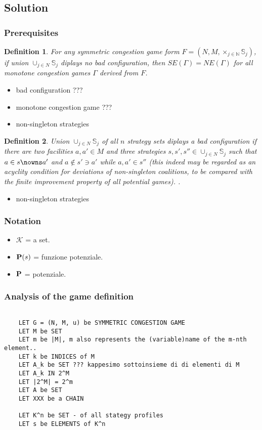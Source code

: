 \documentclass{article}
\newtheorem{defn}{Definition}
\begin{document}
\subsection{Solution}
\subsubsection{Prerequisites}

\begin{defn}
	For any \emph{symmetric congestion game form} $F = (N, M, \times_{j \in \mathbb{N}} \mathbb{S}_j )$, if union $\cup_{j \in N} \mathbb{S}_j$ diplays no bad configuration, then $SE(\Gamma) = NE(\Gamma)$ for all monotone congestion games $\Gamma$ derived from $F$.
\end{defn}
\begin{itemize}
	\item bad configuration ???
	\item monotone congestion game ???
	\item non-singleton strategies
\end{itemize}

\begin{defn}
	Union $\cup_{j \in N} \mathbb{S}_j$ of all $n$ strategy sets diplays a \emph{bad configuration} if there are two facilities $a, a' \in M$ and three strategies $s, s', s'' \in \cup_{j \in N} \mathbb{S}_j$ such that $a \in s \nowns a'$ and $a \not\in s' \owns a'$ while $a, a' \in s''$ (this indeed may be regarded as an acyclity condition for deviations of non-singleton coalitions, to be compared with the finite improvement property of all potential games). \cite{rossi01}.
\end{defn}
\begin{itemize}
	\item non-singleton strategies
\end{itemize}

\subsubsection{Notation}
\begin{itemize}
	\item $\mathcal{K}$ = a set.
	\item $\textbf P(s)$ = funzione potenziale.
	\item $\textbf P$ = potenziale.
\end{itemize}

\subsubsection{Analysis of the game definition}
\begin{verbatim}

    LET G = (N, M, u) be SYMMETRIC CONGESTION GAME
	LET M be SET
	LET m be |M|, m also represents the (variable)name of the m-nth element..
	LET k be INDICES of M
	LET A_k be SET ??? kappesimo sottoinsieme di di elementi di M
	LET A_k IN 2^M
	LET |2^M| = 2^m
	LET A be SET
	LET XXX be a CHAIN
	
	LET K^n be SET - of all stategy profiles
	LET s be ELEMENTS of K^n
\end{verbatim}
\end{document}
